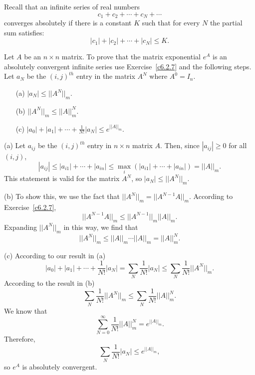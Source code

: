 \documentclass{ximera}
\begin{document}
\begin{computerExercise} \label{c6.2.8}
Recall that an infinite series of real numbers
\[
c_1+c_2 +\cdots+c_N + \cdots
\]
converges absolutely if there is a constant $K$ such that for every $N$
the partial sum satisfies:
\[
|c_1| + |c_2| + \cdots + |c_N| \leq K.
\]

Let $A$ be an $n\times n$ matrix.  To prove that the matrix exponential $e^A$
is an absolutely convergent infinite series use Exercise~\ref{c6.2.7} and the
following steps.  Let $a_N$ be the $(i,j)^{th}$ entry in the matrix $A^N$
where $A^0=I_n$.
\begin{itemize}
\item[(a)]  $|a_N| \leq ||A^N||_m$.
\item[(b)]  $||A^N||_m \leq ||A||_m^N$.
\item[(c)]  $|a_0| + |a_1| + \cdots + \frac{1}{N!}|a_N| \leq e^{||A||_m}$.
\end{itemize}

\begin{solution}

(a) Let $a_{ij}$ be the $(i,j)^{th}$ entry in $n \times n$ matrix $A$. 
Then, since $|a_{ij}| \geq 0$ for all $(i,j)$,
\[ |a_{ij}| \leq |a_{i1}| + \cdots + |a_{in}| \leq
\max_i(|a_{i1}| + \cdots + |a_{in}|) = ||A||_m. \]
This statement is valid for the matrix $A^N$, so $|a_N| \leq ||A^N||_m$.

(b) To show this, we use the fact that $||A^N||_m = ||A^{N - 1}A||_m$.
According to Exercise~\ref{c6.2.7},
\[
||A^{N - 1}A||_m \leq ||A^{N - 1}||_m ||A||_m.
\]
Expanding $||A^N||_m$ in this way, we find that
\[
||A^N||_m \leq ||A||_m \cdots ||A||_m = ||A||^N_m.
\]

(c) According to our result in (a)
\[ |a_0| + |a_1| + \cdots + \frac{1}{N!}|a_N| = \sum_N
\frac{1}{N!}|a_N| \leq \sum_N \frac{1}{N!}||A^N||_m. \]
According to the result in (b)
\[ \sum_N \frac{1}{N!}||A^N||_m \leq \sum_N \frac{1}{N!}||A||^N_m. \]
We know that
\[ \sum_{N = 0}^{\infty} \frac{1}{N!}||A||^N_m = e^{||A||_m}.  \]
Therefore,
\[ \sum_N \frac{1}{N!}|a_N| \leq e^{||A||_m}, \]
so $e^A$ is absolutely convergent.





\end{solution}
\end{computerExercise}
\end{document}
